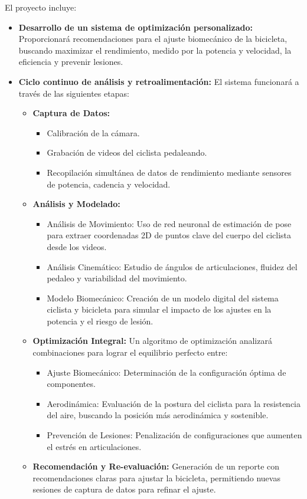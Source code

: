 \documentclass[
11pt, %
]{charter}
\begin{document}
El proyecto incluye:
\begin{itemize}
    \item \textbf{Desarrollo de un sistema de optimización personalizado:} Proporcionará recomendaciones para el ajuste biomecánico de la bicicleta, buscando maximizar el rendimiento, medido por la potencia y velocidad, la eficiencia y prevenir lesiones.

    \item \textbf{Ciclo continuo de análisis y retroalimentación:} El sistema funcionará a través de las siguientes etapas:
        \begin{itemize}
            \item \textbf{Captura de Datos:}
                \begin{itemize}
                 	\item Calibración de la cámara.
                    \item Grabación de videos del ciclista pedaleando.
                    \item Recopilación simultánea de datos de rendimiento mediante sensores de potencia, cadencia y velocidad.
                \end{itemize}
            \item \textbf{Análisis y Modelado:}
                \begin{itemize}
                    \item Análisis de Movimiento: Uso de red neuronal de estimación de pose para extraer coordenadas 2D de puntos clave del cuerpo del ciclista desde los videos.
                    \item Análisis Cinemático: Estudio de ángulos de articulaciones, fluidez del pedaleo y variabilidad del movimiento.
                    \item Modelo Biomecánico: Creación de un modelo digital del sistema ciclista y bicicleta para simular el impacto de los ajustes en la potencia y el riesgo de lesión.
                \end{itemize}
            \item \textbf{Optimización Integral:} Un algoritmo de optimización analizará combinaciones para lograr el equilibrio perfecto entre:
                \begin{itemize}
                    \item Ajuste Biomecánico: Determinación de la configuración óptima de componentes.
                    \item Aerodinámica: Evaluación de la postura del ciclista para la resistencia del aire, buscando la posición más aerodinámica y sostenible.
                    \item Prevención de Lesiones: Penalización de configuraciones que aumenten el estrés en articulaciones.
                \end{itemize}
            \item \textbf{Recomendación y Re-evaluación:} Generación de un reporte con recomendaciones claras para ajustar la bicicleta, permitiendo nuevas sesiones de captura de datos para refinar el ajuste.
        \end{itemize}


\end{itemize}
\end{document}
